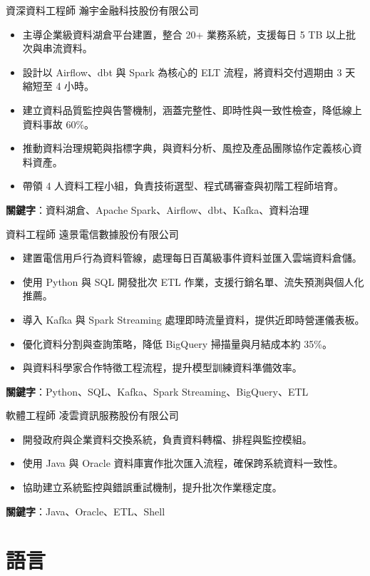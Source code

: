 \documentclass[a4paper, serif, 10pt]{moderncv}
\begin{document}
        {資深資料工程師}
        {瀚宇金融科技股份有限公司}
        {}
        {}
        {\begin{itemize}
\item 主導企業級資料湖倉平台建置，整合 20+ 業務系統，支援每日 5 TB 以上批次與串流資料。
\item 設計以 Airflow、dbt 與 Spark 為核心的 ELT 流程，將資料交付週期由 3 天縮短至 4 小時。
\item 建立資料品質監控與告警機制，涵蓋完整性、即時性與一致性檢查，降低線上資料事故 60\%。
\item 推動資料治理規範與指標字典，與資料分析、風控及產品團隊協作定義核心資料資產。
\item 帶領 4 人資料工程小組，負責技術選型、程式碼審查與初階工程師培育。
\end{itemize}
\textbf{關鍵字}：資料湖倉、Apache Spark、Airflow、dbt、Kafka、資料治理}

        {資料工程師}
        {遠景電信數據股份有限公司}
        {}
        {}
        {\begin{itemize}
\item 建置電信用戶行為資料管線，處理每日百萬級事件資料並匯入雲端資料倉儲。
\item 使用 Python 與 SQL 開發批次 ETL 作業，支援行銷名單、流失預測與個人化推薦。
\item 導入 Kafka 與 Spark Streaming 處理即時流量資料，提供近即時營運儀表板。
\item 優化資料分割與查詢策略，降低 BigQuery 掃描量與月結成本約 35\%。
\item 與資料科學家合作特徵工程流程，提升模型訓練資料準備效率。
\end{itemize}
\textbf{關鍵字}：Python、SQL、Kafka、Spark Streaming、BigQuery、ETL}

        {軟體工程師}
        {凌雲資訊服務股份有限公司}
        {}
        {}
        {\begin{itemize}
\item 開發政府與企業資料交換系統，負責資料轉檔、排程與監控模組。
\item 使用 Java 與 Oracle 資料庫實作批次匯入流程，確保跨系統資料一致性。
\item 協助建立系統監控與錯誤重試機制，提升批次作業穩定度。
\end{itemize}
\textbf{關鍵字}：Java、Oracle、ETL、Shell}
\section{語言}
\end{document}
